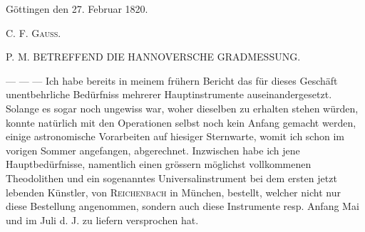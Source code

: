 Göttingen den 27. Februar 1820.
\begin{flushright}C. F. \textsc{Gauss}.\end{flushright}

\par\bigskip{}
\begin{center}\large P. M. BETREFFEND DIE HANNOVERSCHE GRADMESSUNG.\end{center}
\par
— — — Ich habe bereits in meinem frühern Bericht das für dieses Geschäft unentbehrliche Bedürfniss mehrerer Hauptinstrumente auseinandergesetzt. Solange es sogar noch ungewiss war, woher dieselben zu erhalten stehen würden, konnte natürlich mit den Operationen selbst noch kein Anfang gemacht werden, einige astronomische Vorarbeiten auf hiesiger Sternwarte, womit ich schon im vorigen Sommer angefangen, abgerechnet. Inzwischen habe ich jene Hauptbedürfnisse, namentlich einen grössern möglichst vollkommenen Theodolithen und ein sogenanntes Universalinstrument bei dem ersten jetzt lebenden Künstler, von \textsc{Reichenbach} in München, bestellt, welcher nicht nur diese Bestellung angenommen, sondern auch diese Instrumente resp. Anfang Mai und im Juli d. J. zu liefern versprochen hat.
